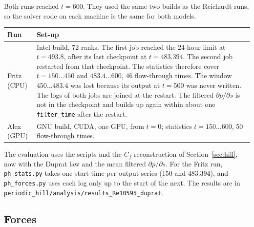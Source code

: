 \documentclass[11pt,a4paper]{article}
\newcommand{\code}[1]{\texttt{#1}}
\newcommand{\dpds}{\partial p/\partial s}
\begin{document}
\noindent Both runs reached $t = 600$. They used the same two builds as the
Reichardt runs, so the solver code on each machine is the same for both
models.

\begin{center}
\small
\begin{tabularx}{\textwidth}{@{}lX@{}}
\toprule
Run & Set-up \\
\midrule
Fritz (CPU) & Intel build, 72 ranks. The first job reached the 24-hour limit
at $t = 493.8$, after its last checkpoint at $t = 483.394$. The second job
restarted from that checkpoint. The statistics therefore cover
$t = 150\ldots450$ and $483.4\ldots600$, 46 flow-through times. The window
$450\ldots483.4$ was lost because its output at $t = 500$ was never
written. The logs of both jobs are joined at the restart. The filtered
$\dpds$ is not in the checkpoint and builds up again within about one
\code{filter\_time} after the restart. \\
Alex (GPU) & GNU build, CUDA, one GPU, from $t = 0$; statistics
$t = 150\ldots600$, 50 flow-through times. \\
\bottomrule
\end{tabularx}
\end{center}

\noindent The evaluation uses the scripts and the $C_f$ reconstruction of
Section~\ref{sec:hill}, now with the Duprat law and the mean filtered $\dpds$.
For the Fritz run, \code{ph\_stats.py} takes one start time per output series
(150 and 483.394), and \code{ph\_forces.py} uses each log only up to the start
of the next. The results are in
\code{periodic\_hill/analysis/results\_Re10595\_duprat}.

\subsection{Forces}
\end{document}
